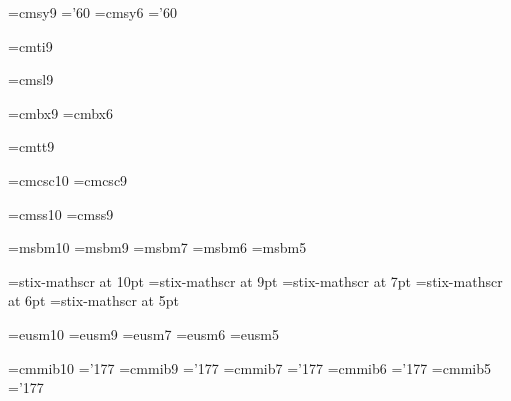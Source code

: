 \font\ninesy=cmsy9 \skewchar\ninesy='60
\font\sixsy=cmsy6  \skewchar\sixsy='60

\font\nineit=cmti9

\font\ninesl=cmsl9

\font\ninebf=cmbx9
\font\sixbf=cmbx6

\font\ninett=cmtt9

\font\tensc=cmcsc10
\font\ninesc=cmcsc9

\font\tenss=cmss10
\font\niness=cmss9

\font\tenbb=msbm10
\font\ninebb=msbm9
\font\sevenbb=msbm7
\font\sixbb=msbm6
\font\fivebb=msbm5

\font\tenscr=stix-mathscr at 10pt
\font\ninescr=stix-mathscr at 9pt
\font\sevenscr=stix-mathscr at 7pt
\font\sixscr=stix-mathscr at 6pt
\font\fivescr=stix-mathscr at 5pt

\font\teneucal=eusm10
\font\nineeucal=eusm9
\font\seveneucal=eusm7
\font\sixeucal=eusm6
\font\fiveeucal=eusm5

\font\tenbmit=cmmib10  \skewchar\tenbmit='177
\font\ninebmit=cmmib9  \skewchar\ninebmit='177
\font\sevenbmit=cmmib7 \skewchar\sevenbmit='177
\font\sixbmit=cmmib6   \skewchar\sixbmit='177
\font\fivebmit=cmmib5  \skewchar\fivebmit='177

\chardef{}
\chardef{}
\chardef{}
\chardef{}
\newfam\scfam
\newfam\ssfam
\newfam\bbfam
\newfam\scrfam
\newfam\eucalfam
\newfam\bmitfam

\def\initfam#1#2#3#4{%
	\textfont#1=#2%
	\scriptfont#1=#3%
	\scriptscriptfont#1=#4}

\def\bb{\fam=\bbfam}
\def\scr{\fam=\scrfam}
\def\eucal{\fam=\eucalfam}
\def\bmit{\fam=\bmitfam}

\def\tenpt{%
	\initfam\rmfam\tenrm\sevenrm\fiverm
	\initfam\mitfam\teni\seveni\fivei
	\initfam\syfam\tensy\sevensy\fivesy
	\initfam\itfam\tenit\nullfont\nullfont
	\initfam\slfam\tensl\nullfont\nullfont
	\initfam\bffam\tenbf\sevenbf\fivebf
	\initfam\ttfam\tentt\nullfont\nullfont
	\initfam\scfam\tensc\nullfont\nullfont
	\initfam\ssfam\tenss\nullfont\nullfont
	\initfam\bbfam\tenbb\sevenbb\fivebb
	\initfam\scrfam\tenscr\sevenscr\fivescr
	\initfam\eucalfam\teneucal\seveneucal\fiveeucal
	\initfam\bmitfam\tenbmit\sevenbmit\fivebmit
	\def\rm{\fam=\rmfam \tenrm}%
	\def\it{\fam=\itfam \tenit}%
	\def\sl{\fam=\slfam \tensl}%
	\def\bf{\fam=\bffam \tenbf}%
	\def\tt{\fam=\ttfam \tentt}%
	\def\sc{\fam=\scfam \tensc}%
	\def\ss{\fam=\ssfam \tenss}%
	\setbox\strutbox=\hbox{\vrule height8.5pt depth3.5pt width0pt}%
	\abovedisplayskip=12pt plus3pt minus9pt
	\belowdisplayskip=12pt plus3pt minus9pt
	\abovedisplayshortskip=0pt plus3pt
	\belowdisplayshortskip=7pt plus3pt minus4pt
	\normalbaselineskip=12pt
	\normalbaselines\rm}

